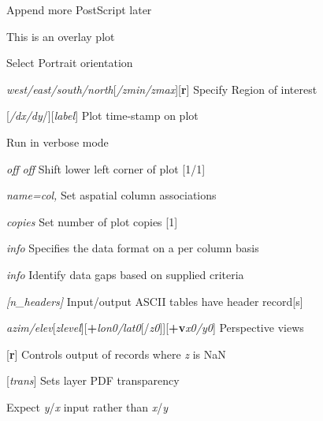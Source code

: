 \documentclass{article}
\begin{document}
\par {}	Append more PostScript later\par 

\par {}	This is an overlay plot\par 

\par {}	Select Portrait orientation\par 

\par {}\emph{west/east/south/north}[\emph{/zmin/zmax}][\textbf{r}]	Specify Region of interest\par 

\par {}[\emph{/dx/dy}/][\emph{label}]	Plot time-stamp on plot\par 

\par {}	Run in verbose mode\par 

\par {}\emph{off} \emph{off}	Shift lower left corner of plot [1/1]\par 

\par {}\emph{name=col,}	Set aspatial column associations\par 

\par {}\emph{copies}	Set number of plot copies [1]\par 

\par {}\emph{info}	Specifies the data format on a per column basis  \par

\par {}\emph{info}	Identify data gaps based on supplied criteria  \par

\par {}\emph{[n\_headers]}	Input/output ASCII tables have header record[s]\par 

\par {}\emph{azim/elev}[\emph{zlevel}][\textbf{+}\emph{lon0/lat0}[/\emph{z0}]][\textbf{+v}\emph{x0/y0}]	Perspective views\par

\par {}[\textbf{r}]	Controls output of records where \emph{z} is NaN	\par

\par {}[\emph{trans}]	Sets layer PDF transparency  \par

\par \Opt{:}	Expect \emph{y}/\emph{x} input rather than \emph{x}/\emph{y}\par 
\end{document}
